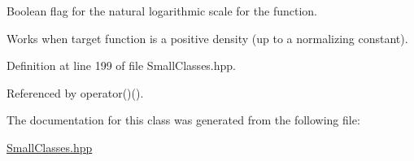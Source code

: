 \-Boolean flag for the natural logarithmic scale for the function. 

\-Works when target function is a positive density (up to a normalizing constant). 

\-Definition at line 199 of file \-Small\-Classes.\-hpp.



\-Referenced by operator()().



\-The documentation for this class was generated from the following file\-:\begin{DoxyCompactItemize}
\item 
\hyperlink{SmallClasses_8hpp}{\-Small\-Classes.\-hpp}\end{DoxyCompactItemize}
